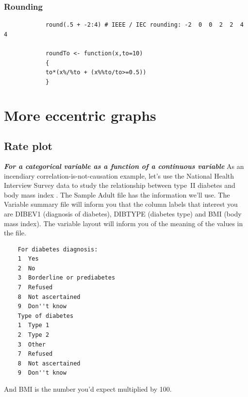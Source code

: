 \documentclass{report}
\newcommand{\notefor}[1]{\hfill\textbf{\textit{#1}}}
\begin{document}
		\subsection{Rounding}
		
		\begin{verbatim}
			round(.5 + -2:4) # IEEE / IEC rounding: -2  0  0  2  2  4  4
			
			roundTo <- function(x,to=10)
			{
			to*(x%/%to + (x%%to/to>=0.5))
			}
		\end{verbatim}
		
		
	
\chapter{More eccentric graphs}
	\section{Rate plot}\label{sec:cdplot}
	\notefor{For a categorical variable as a function of a continuous variable}
	As an incendiary correlation-is-not-causation example, let's use the National Health Interview Survey data to study the relationship between type~II diabetes and body mass index \cite{nhis}. The Sample Adult file has the information we'll use. The Variable summary file will inform you that the column labels that interest you are DIBEV1 (diagnosis of diabetes), DIBTYPE (diabetes type) and BMI (body mass index). The variable layout will inform you of the meaning of the values in the file.
	\begin{verbatim}
	For diabetes diagnosis: 
	1  Yes
	2  No
	3  Borderline or prediabetes
	7  Refused
	8  Not ascertained
	9  Don''t know 
	Type of diabetes
	1  Type 1
	2  Type 2
	3  Other
	7  Refused
	8  Not ascertained
	9  Don''t know 
	\end{verbatim}
	And BMI is the number you'd expect multiplied by 100.
	
\end{document}
